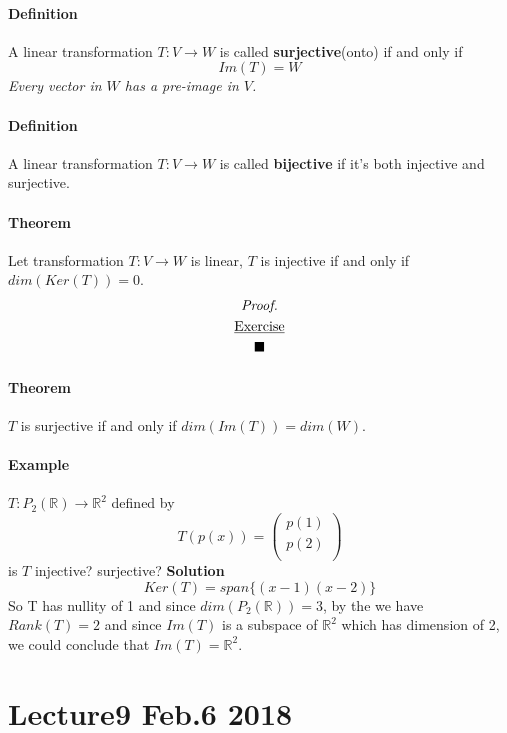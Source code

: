 \documentclass[11pt]{article}
\begin{document}
 	\paragraph{Definition} A linear transformation $T: V \to W$ is called \textbf{surjective}(onto) if and only if
 	\[
 		Im(T) = W
 	\]
 	\emph{Every vector in $W$ has a pre-image in $V$.}
 	
 	\paragraph{Definition} A linear transformation $T: V \to W$ is called \textbf{bijective} if it's both injective and surjective.
 	
 	\paragraph{Theorem } Let transformation $T: V \to W$ is linear, $T$ is injective if and only if $dim(Ker(T)) = 0$.
 	\begin{multline*}
 		\emph{Proof.} \\
 		\underbar{Exercise} \\
 		\blacksquare
 	\end{multline*}
 	
 	\paragraph{Theorem} $T$ is surjective if and only if $dim(Im(T)) = dim(W)$.
 	\paragraph{Example}$T: P_2(\mathbb{R}) \to \mathbb{R}^2$ defined by 
 	\[
 		T(p(x)) = \begin{pmatrix}
 			p(1) \\
 			p(2) \\
 		\end{pmatrix}
 	\] is $T$ injective? surjective?
 	\newline {}
 	\newline
 	\textbf{Solution}
 	\[
 		Ker(T) = span\{(x-1)(x-2)\}
 	\]
 	So T has nullity of 1 and since $dim(P_2(\mathbb{R})) = 3$, by the  we have $Rank(T) = 2$ and since $Im(T)$ is a subspace of $\mathbb{R}^2$ which has dimension of 2, we could conclude that $Im(T) = \mathbb{R}^2$.
 	
 	
 	\section{Lecture9 Feb.6 2018}
\end{document}
